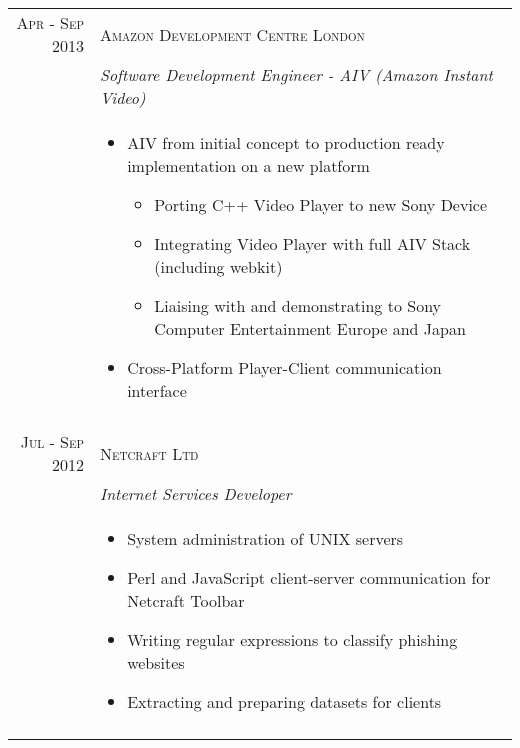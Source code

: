 \begin{tabular}{r|p{11cm}}
\textsc{Apr - Sep 2013} & \textsc{Amazon Development Centre London}\\ 
& \emph{Software Development Engineer - AIV (Amazon Instant Video)}\\
& \begin{footnotesize}
\begin{itemize}
	\vspace*{-\baselineskip}
	\item AIV from initial concept to production ready implementation on a new platform
		\begin{itemize}
		\item Porting C++ Video Player to new Sony Device
		\item Integrating Video Player with full AIV Stack (including webkit)
		\item Liaising with and demonstrating to Sony Computer Entertainment Europe and Japan
		\end{itemize}
	\item Cross-Platform Player-Client communication interface
	\vspace*{-\baselineskip}
\end{itemize}
\end{footnotesize}\\

\multicolumn{2}{c}{} \\


\textsc{Jul - Sep 2012} & \textsc{Netcraft Ltd}\\ 
& \emph{Internet Services Developer}\\
& \begin{footnotesize}
\begin{itemize}
	\vspace*{-\baselineskip}
	\item System administration of UNIX servers
	\item Perl and JavaScript client-server communication for Netcraft Toolbar
	\item Writing regular expressions to classify phishing websites
	\item Extracting and preparing datasets for clients
	\vspace*{-\baselineskip}
\end{itemize}
\end{footnotesize}\\

\multicolumn{2}{c}{} \\


\end{tabular}
